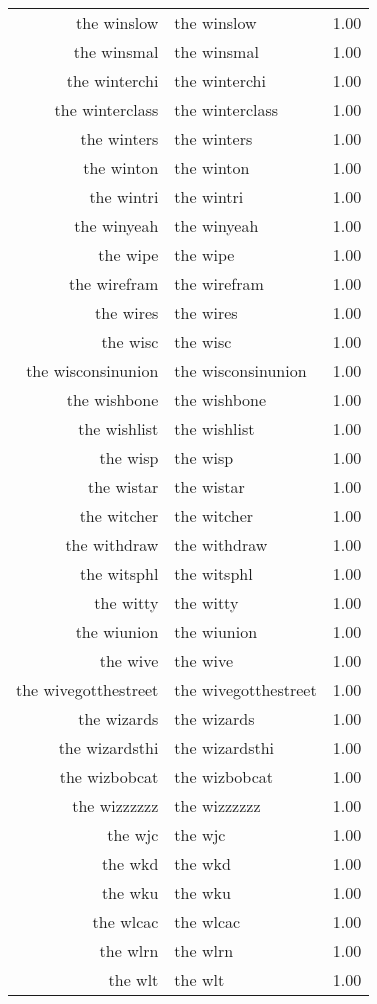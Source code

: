 \begin{table}[ht]
\begin{tabular}{rlr}
  the winslow & the winslow & 1.00 \\ 
  the winsmal & the winsmal & 1.00 \\ 
  the winterchi & the winterchi & 1.00 \\ 
  the winterclass & the winterclass & 1.00 \\ 
  the winters & the winters & 1.00 \\ 
  the winton & the winton & 1.00 \\ 
  the wintri & the wintri & 1.00 \\ 
  the winyeah & the winyeah & 1.00 \\ 
  the wipe & the wipe & 1.00 \\ 
  the wirefram & the wirefram & 1.00 \\ 
  the wires & the wires & 1.00 \\ 
  the wisc & the wisc & 1.00 \\ 
  the wisconsinunion & the wisconsinunion & 1.00 \\ 
  the wishbone & the wishbone & 1.00 \\ 
  the wishlist & the wishlist & 1.00 \\ 
  the wisp & the wisp & 1.00 \\ 
  the wistar & the wistar & 1.00 \\ 
  the witcher & the witcher & 1.00 \\ 
  the withdraw & the withdraw & 1.00 \\ 
  the witsphl & the witsphl & 1.00 \\ 
  the witty & the witty & 1.00 \\ 
  the wiunion & the wiunion & 1.00 \\ 
  the wive & the wive & 1.00 \\ 
  the wivegotthestreet & the wivegotthestreet & 1.00 \\ 
  the wizards & the wizards & 1.00 \\ 
  the wizardsthi & the wizardsthi & 1.00 \\ 
  the wizbobcat & the wizbobcat & 1.00 \\ 
  the wizzzzzz & the wizzzzzz & 1.00 \\ 
  the wjc & the wjc & 1.00 \\ 
  the wkd & the wkd & 1.00 \\ 
  the wku & the wku & 1.00 \\ 
  the wlcac & the wlcac & 1.00 \\ 
  the wlrn & the wlrn & 1.00 \\ 
  the wlt & the wlt & 1.00 \\ 

\end{tabular}
\end{table}
